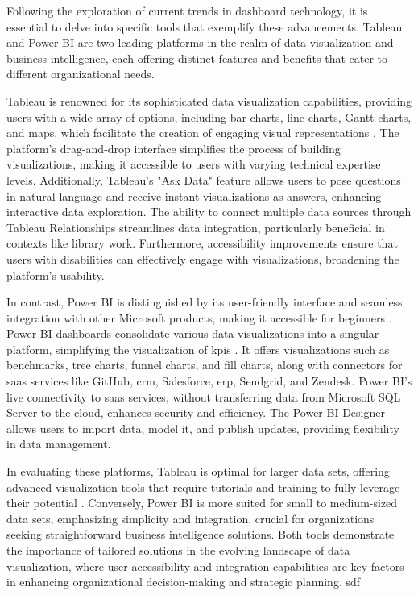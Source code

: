 Following the exploration of current trends 
in dashboard technology, it is essential to 
delve into specific tools that exemplify 
these advancements. Tableau and Power BI 
are two leading platforms in the realm of 
data visualization and business intelligence, 
each offering distinct features and benefits 
that cater to different organizational needs.

Tableau is renowned for its sophisticated data 
visualization capabilities, providing users 
with a wide array of options, including bar 
charts, line charts, Gantt charts, and maps, 
which facilitate the creation of engaging visual 
representations \autocite[p.159]{beardTableauVersion202032021}. 
The platform's 
drag-and-drop interface simplifies the process 
of building visualizations, making it accessible 
to users with varying technical expertise levels. 
Additionally, Tableau's "Ask Data" feature 
allows users to pose questions in natural 
language and receive instant visualizations 
as answers, enhancing interactive data exploration. 
The ability to connect multiple data sources 
through Tableau Relationships streamlines data 
integration, particularly beneficial in contexts 
like library work. Furthermore, 
accessibility improvements ensure that users 
with disabilities can effectively engage with 
visualizations, broadening the platform's usability.

In contrast, Power BI is distinguished by its 
user-friendly interface and seamless integration 
with other Microsoft products, making it 
accessible for beginners \autocite[p.1046]{sahayaPoweringSalesInsights2024}. 
Power BI dashboards consolidate various data 
visualizations into a singular platform, 
simplifying the visualization of \gls{kpi}s \autocite[p.130]{khatuwalBusinessIntelligenceTools2022}. 
It offers visualizations such as benchmarks, 
tree charts, funnel charts, and fill charts, 
along with connectors for \gls{saas} services like 
GitHub, \gls{crm}, Salesforce, \gls{erp}, Sendgrid, and 
Zendesk.
Power BI's live connectivity to \gls{saas} services, 
without transferring data from Microsoft 
SQL Server to the cloud, enhances security 
and efficiency. 
The Power BI Designer allows users to import data, 
model it, and publish updates, providing 
flexibility in data management.

In evaluating these platforms, 
Tableau is optimal for larger data sets, 
offering advanced visualization tools that 
require tutorials and training to fully leverage 
their potential \autocite[p.1046]{sahayaPoweringSalesInsights2024}. 
Conversely, Power BI is more suited for small to 
medium-sized data sets, emphasizing simplicity 
and integration, crucial for organizations seeking 
straightforward business intelligence solutions. 
Both tools demonstrate the importance of 
tailored solutions in the evolving landscape 
of data visualization, where user accessibility 
and integration capabilities are key factors in 
enhancing organizational decision-making and 
strategic planning.
sdf
